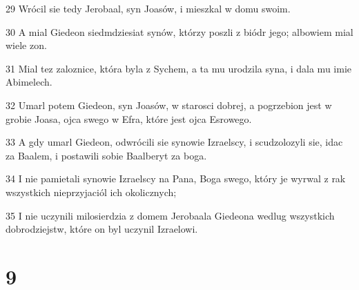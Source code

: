 \par 29 Wrócil sie tedy Jerobaal, syn Joasów, i mieszkal w domu swoim.
\par 30 A mial Giedeon siedmdziesiat synów, którzy poszli z biódr jego; albowiem mial wiele zon.
\par 31 Mial tez zaloznice, która byla z Sychem, a ta mu urodzila syna, i dala mu imie Abimelech.
\par 32 Umarl potem Giedeon, syn Joasów, w starosci dobrej, a pogrzebion jest w grobie Joasa, ojca swego w Efra, które jest ojca Esrowego.
\par 33 A gdy umarl Giedeon, odwrócili sie synowie Izraelscy, i scudzolozyli sie, idac za Baalem, i postawili sobie Baalberyt za boga.
\par 34 I nie pamietali synowie Izraelscy na Pana, Boga swego, który je wyrwal z rak wszystkich nieprzyjaciól ich okolicznych;
\par 35 I nie uczynili milosierdzia z domem Jerobaala Giedeona wedlug wszystkich dobrodziejstw, które on byl uczynil Izraelowi.

\chapter{9}

